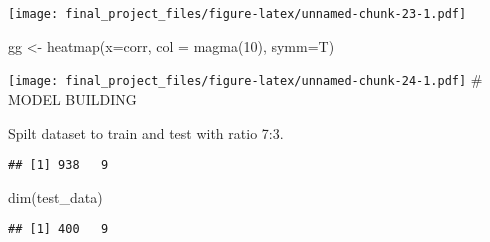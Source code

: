 \documentclass[
]{article}
\newenvironment{Shaded}{\begin{snugshade}}{\end{snugshade}}
\newcommand{\AttributeTok}[1]{\textcolor[rgb]{0.77,0.63,0.00}{#1}}
\newcommand{\CommentTok}[1]{\textcolor[rgb]{0.56,0.35,0.01}{\textit{#1}}}
\newcommand{\ConstantTok}[1]{\textcolor[rgb]{0.00,0.00,0.00}{#1}}
\newcommand{\DecValTok}[1]{\textcolor[rgb]{0.00,0.00,0.81}{#1}}
\newcommand{\FloatTok}[1]{\textcolor[rgb]{0.00,0.00,0.81}{#1}}
\newcommand{\FunctionTok}[1]{\textcolor[rgb]{0.00,0.00,0.00}{#1}}
\newcommand{\NormalTok}[1]{#1}
\newcommand{\OtherTok}[1]{\textcolor[rgb]{0.56,0.35,0.01}{#1}}
\newcommand{\SpecialCharTok}[1]{\textcolor[rgb]{0.00,0.00,0.00}{#1}}
\begin{document}
\texttt{[image: final\_project\_files/figure-latex/unnamed-chunk-23-1.pdf]}

\begin{Shaded}
\begin{Highlighting}[]
\NormalTok{gg }\OtherTok{\textless{}{-}} \FunctionTok{heatmap}\NormalTok{(}\AttributeTok{x=}\NormalTok{corr, }\AttributeTok{col =} \FunctionTok{magma}\NormalTok{(}\DecValTok{10}\NormalTok{), }\AttributeTok{symm=}\NormalTok{T)}
\end{Highlighting}
\end{Shaded}

\texttt{[image: final\_project\_files/figure-latex/unnamed-chunk-24-1.pdf]}
\# MODEL BUILDING

Spilt dataset to train and test with ratio 7:3.

\begin{Shaded}
\end{Shaded}

\begin{verbatim}
## [1] 938   9
\end{verbatim}

\begin{Shaded}
\begin{Highlighting}[]
\FunctionTok{dim}\NormalTok{(test\_data)}
\end{Highlighting}
\end{Shaded}

\begin{verbatim}
## [1] 400   9
\end{verbatim}
\end{document}

